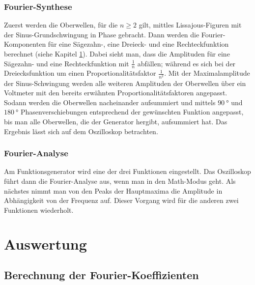\subsubsection{Fourier-Synthese}
Zuerst werden die Oberwellen, für die $n \ge 2$ gilt, mittles Lissajous-Figuren
mit der Sinus-Grundschwingung in Phase gebracht. Dann werden die Fourier-Komponenten
für eine Sägezahn-, eine Dreieck- und eine Rechteckfunktion berechnet (siehe Kapitel \ref{sec:auswertung}).
Dabei sieht man, dass die Amplituden für eine Sägezahn- und eine Rechteckfunktion mit
$\frac{1}{n}$ abfällen; während es sich bei der Dreiecksfunktion um einen Proportionalitätsfaktor
$\frac{1}{n^2}$. Mit der Maximalamplitude der Sinus-Schwingung werden alle weiteren Amplituden
der Oberwellen über ein Voltmeter mit den bereits erwähnten Proportionalitätsfaktoren angepasst.
Sodann werden die Oberwellen nacheinander aufsummiert und mittels $\SI{90}{\degree}$ und
$\SI{180}{\degree}$ Phasenverschiebungen entsprechend der gewünschten Funktion angepasst,
bis man alle Oberwellen, die der Generator hergibt, aufsummiert hat. Das Ergebnis lässt
sich auf dem Oszilloskop betrachten.

\subsubsection{Fourier-Analyse}
Am Funktionsgenerator wird eine der drei Funktionen eingestellt. Das Oszilloskop
führt dann die Fourier-Analyse aus, wenn man in den Math-Modus geht. Als nächstes
nimmt man von den Peaks der Hauptmaxima die Amplitude in Abhängigkeit von der
Frequenz auf. Dieser Vorgang wird für die anderen zwei Funktionen wiederholt.

\section{Auswertung}
\label{sec:auswertung}
\subsection{Berechnung der Fourier-Koeffizienten}
